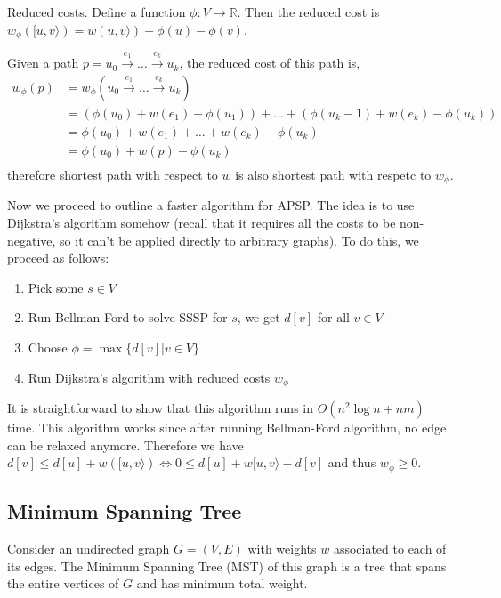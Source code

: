 \begin{definition}{Reduced costs.}
  Define a function $\phi: V\rightarrow\mathbb{R}$.  Then the reduced cost is
  $w_\phi([u,v\rangle)=w(u,v\rangle)+\phi(u)-\phi(v)$.
\end{definition}
Given a path $p=u_0\xrightarrow{e_1}\ldots\xrightarrow{e_k}u_k$, the reduced cost
of this path is,
\begin{align*}
  w_\phi(p) &= w_\phi(u_0\xrightarrow{e_1}\ldots\xrightarrow{e_k}u_k)\\
            &= (\phi(u_0)+w(e_1)-\phi(u_1))+\ldots+(\phi(u_k-1)+w(e_k)-\phi(u_k))\\
            &= \phi(u_0)+w(e_1)+\ldots+w(e_k)-\phi(u_k)\\
            &= \phi(u_0)+w(p)-\phi(u_k)\\
\end{align*}
therefore shortest path with respect to $w$ is also shortest path with respetc
to $w_\phi$.

Now we proceed to outline a faster algorithm for APSP.  The idea is to use
Dijkstra's algorithm somehow (recall that it requires all the costs to be
non-negative, so it can't be applied directly to arbitrary graphs).  To do
this, we proceed as follows:
\begin{enumerate}
  \item Pick some $s\in V$
  \item Run Bellman-Ford to solve SSSP for $s$, we get $d[v]$ for all $v\in V$
  \item Choose $\phi=\max\{d[v]|v\in V\}$
  \item Run Dijkstra's algorithm with reduced costs $w_\phi$
\end{enumerate}
It is straightforward to show that this algorithm runs in $O(n^2\log n + nm)$
time.  This algorithm works since after running Bellman-Ford algorithm, no edge
can be relaxed anymore.  Therefore we have $d[v]\leq d[u]+w([u,v\rangle)\iff
  0\leq d[u]+w[u,v\rangle -d[v]$ and thus $w_\phi\geq 0$.


\subsection{Minimum Spanning Tree}
Consider an undirected graph $G=(V,E)$ with weights $w$ associated to each of
its edges.  The Minimum Spanning Tree (MST) of this graph is a tree that spans
the entire vertices of $G$ and has minimum total weight. 


